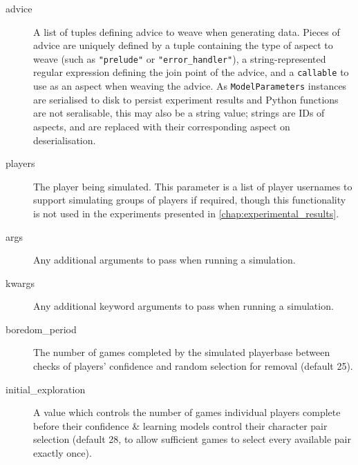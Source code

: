 \begin{description}
  \item[advice] A list of tuples defining advice to weave when generating data.
  Pieces of advice are uniquely defined by a tuple containing the type of aspect
  to weave (such as \lstinline{"prelude"} or \lstinline{"error_handler"}), a
  string-represented regular expression defining the join point of the advice,
  and a \lstinline{callable} to use as an aspect when weaving the advice. As
  \lstinline{ModelParameters} instances are serialised to disk to persist
  experiment results and Python functions are not seralisable, this may also be
  a string value; strings are IDs of aspects, and are replaced with their
  corresponding aspect on deserialisation.
  \item[players] The player being simulated. This parameter is a list of player
  usernames to support simulating groups of players if required, though this
  functionality is not used in the experiments presented in
  \cref{chap:experimental_results}.
  \item[args] Any additional arguments to pass when running a simulation.
  \item[kwargs] Any additional keyword arguments to pass when running a simulation.
  \item[boredom\_period] The number of games completed by the simulated
  playerbase between checks of players' confidence and random selection for
  removal (default 25).
  \item[initial\_exploration] A value which controls the number of
  games individual players complete before their confidence \& learning models control
  their character pair selection (default 28, to allow sufficient games to
  select every available pair exactly once).
\end{description}

